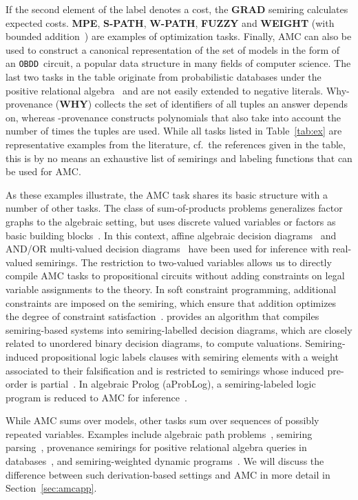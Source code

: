 \documentclass{article}
\theoremstyle{plain}
\theoremstyle{definition}
\newcommand{\OBDDo}{{\tt OBDD}}
\begin{document}
If the second element of the label denotes a cost, the \textbf{GRAD} semiring
calculates expected costs. 
\textbf{MPE}, \textbf{S-PATH},  \textbf{W-PATH},  \textbf{FUZZY}  and
\textbf{WEIGHT} (with bounded addition~) are examples of
optimization tasks. Finally, AMC can also
be used to construct a canonical representation of the set of models
in the form of an \OBDDo\ circuit, a popular data structure in many
fields of computer science. 
The last two tasks in the table originate from probabilistic databases under the positive 
relational algebra~ and are not easily extended to
negative literals. Why-provenance (\textbf{WHY})
collects the set of identifiers of all tuples an answer depends on, whereas 
-provenance constructs polynomials that also take into
account the number of times the tuples are used.
While all tasks listed in Table~\ref{tab:ex} are representative examples from the literature, cf.~the references given in
the table, this is by no means an exhaustive list of semirings
and labeling functions that can be used for AMC.

As these examples illustrate, 
the AMC task shares its basic structure with a number
of other tasks. 
The class of sum-of-products problems
generalizes factor graphs to the algebraic setting, but uses
discrete valued variables or factors as basic building
blocks~\citep{bacchus2009solving}. In this context, affine algebraic
decision diagrams~\citep{Sanner05} and AND/OR multi-valued decision
diagrams~\citep{Mateescu08} have been used for inference with real-valued semirings. The
restriction to two-valued variables allows us to directly compile AMC
tasks to propositional circuits without adding constraints on legal
variable assignments to the theory. In soft
constraint programming, additional constraints are
imposed on the semiring, which ensure that addition optimizes the
degree of constraint satisfaction~\citep{Meseguer06}. \cite{Wilson05}
provides an algorithm that compiles semiring-based systems into
semiring-labelled decision diagrams, which are closely related to
unordered binary decision diagrams, to compute valuations.  Semiring-induced
propositional logic labels clauses with semiring elements with a
weight associated to their falsification and is restricted to
semirings whose induced pre-order is partial~\citep{Larrosa10}. In algebraic Prolog
(aProbLog), a semiring-labeled logic program is
reduced to  AMC for inference~\citep{Kimmig11}. 

While AMC sums over models, other tasks sum over sequences
of possibly repeated variables. Examples include 
algebraic path
problems~\citep{baras2010path}, semiring
parsing~\citep{Goodman99}, provenance semirings for positive
relational algebra queries in databases~\citep{Green2007}, and
semiring-weighted dynamic programs~\citep{Eisner05}. We will discuss  the difference
between such derivation-based settings and AMC in 
more detail 
in Section~\ref{sec:amcapp}.
\end{document}
